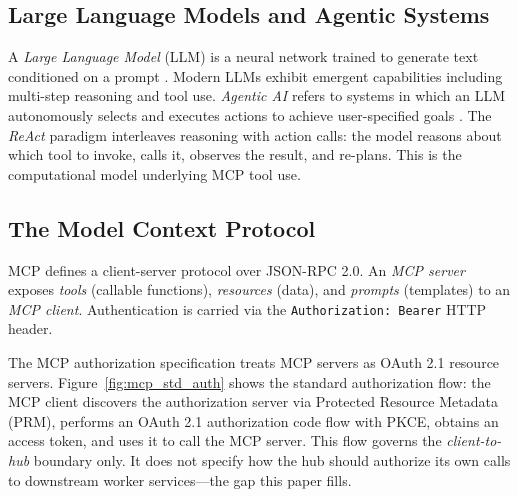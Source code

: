 \documentclass[journal]{IEEEtran}
\begin{document}
\subsection{Large Language Models and Agentic Systems}

A \textit{Large Language Model} (LLM) is a neural network trained to generate
text conditioned on a prompt \cite{vaswani2017}. Modern LLMs exhibit emergent
capabilities including multi-step reasoning and tool use. \textit{Agentic AI}
refers to systems in which an LLM autonomously selects and executes actions to
achieve user-specified goals \cite{wang2024survey}. The \textit{ReAct} paradigm
\cite{yao2022react} interleaves reasoning with action calls: the model reasons
about which tool to invoke, calls it, observes the result, and re-plans. This
is the computational model underlying MCP tool use.

\subsection{The Model Context Protocol}

MCP \cite{mcp_spec} defines a client-server protocol over JSON-RPC 2.0. An
\textit{MCP server} exposes \textit{tools} (callable functions), \textit{resources}
(data), and \textit{prompts} (templates) to an \textit{MCP client}. Authentication
is carried via the \texttt{Authorization: Bearer} HTTP header.

The MCP authorization specification \cite{mcp_spec_2025} treats MCP servers as
OAuth 2.1 resource servers. Figure~\ref{fig:mcp_std_auth} shows the standard
authorization flow: the MCP client discovers the authorization server via
Protected Resource Metadata (PRM), performs an OAuth 2.1 authorization code flow
with PKCE, obtains an access token, and uses it to call the MCP server. This flow
governs the \textit{client-to-hub} boundary only. It does not specify how the hub
should authorize its own calls to downstream worker services---the gap this paper
fills.
\end{document}
